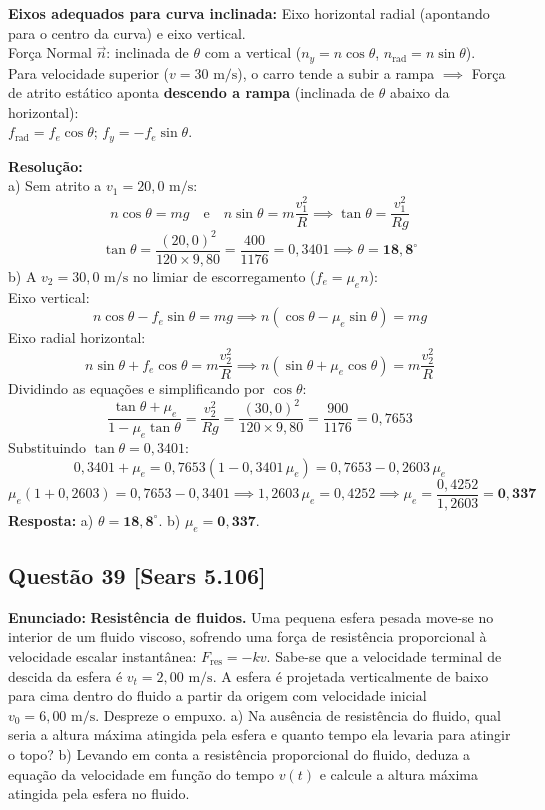 \documentclass[11pt,a4paper]{article}
\begin{document}
\begin{dclbox}
\textbf{Eixos adequados para curva inclinada:} Eixo horizontal radial (apontando para o centro da curva) e eixo vertical.\\
Força Normal $\vec{n}$: inclinada de $\theta$ com a vertical ($n_y = n\cos\theta$, $n_{\text{rad}} = n\sin\theta$).\\
Para velocidade superior ($v = 30\text{ m/s}$), o carro tende a subir a rampa $\implies$ Força de atrito estático aponta \textbf{descendo a rampa} (inclinada de $\theta$ abaixo da horizontal):\\
$f_{\text{rad}} = f_e \cos\theta$; $f_y = -f_e \sin\theta$.
\end{dclbox}

\noindent
\textbf{Resolução:}\\
a) Sem atrito a $v_1 = 20,0\text{ m/s}$:
\[ n\cos\theta = mg \quad \text{e} \quad n\sin\theta = m \frac{v_1^2}{R} \implies \tan\theta = \frac{v_1^2}{Rg} \]
\[ \tan\theta = \frac{(20,0)^2}{120 \times 9,80} = \frac{400}{1176} = 0,3401 \implies \theta = \mathbf{18,8^\circ} \]
b) A $v_2 = 30,0\text{ m/s}$ no limiar de escorregamento ($f_e = \mu_e n$):\\
Eixo vertical:
\[ n\cos\theta - f_e\sin\theta = mg \implies n(\cos\theta - \mu_e\sin\theta) = mg \]
Eixo radial horizontal:
\[ n\sin\theta + f_e\cos\theta = m \frac{v_2^2}{R} \implies n(\sin\theta + \mu_e\cos\theta) = m \frac{v_2^2}{R} \]
Dividindo as equações e simplificando por $\cos\theta$:
\[ \frac{\tan\theta + \mu_e}{1 - \mu_e\tan\theta} = \frac{v_2^2}{Rg} = \frac{(30,0)^2}{120 \times 9,80} = \frac{900}{1176} = 0,7653 \]
Substituindo $\tan\theta = 0,3401$:
\[ 0,3401 + \mu_e = 0,7653(1 - 0,3401\,\mu_e) = 0,7653 - 0,2603\,\mu_e \]
\[ \mu_e(1 + 0,2603) = 0,7653 - 0,3401 \implies 1,2603\,\mu_e = 0,4252 \implies \mu_e = \frac{0,4252}{1,2603} = \mathbf{0,337} \]
\textbf{Resposta:} a) $\theta = \mathbf{18,8^\circ}$. b) $\mu_e = \mathbf{0,337}$.

\vspace{0.3cm}
\subsection*{Questão 39 [Sears 5.106]}
\textbf{Enunciado:} \textbf{Resistência de fluidos.} Uma pequena esfera pesada move-se no interior de um fluido viscoso, sofrendo uma força de resistência proporcional à velocidade escalar instantânea: $F_{\text{res}} = -k v$. Sabe-se que a velocidade terminal de descida da esfera é $v_t = 2,00\text{ m/s}$. A esfera é projetada verticalmente de baixo para cima dentro do fluido a partir da origem com velocidade inicial $v_0 = 6,00\text{ m/s}$. Despreze o empuxo. a) Na ausência de resistência do fluido, qual seria a altura máxima atingida pela esfera e quanto tempo ela levaria para atingir o topo? b) Levando em conta a resistência proporcional do fluido, deduza a equação da velocidade em função do tempo $v(t)$ e calcule a altura máxima atingida pela esfera no fluido.
\end{document}

